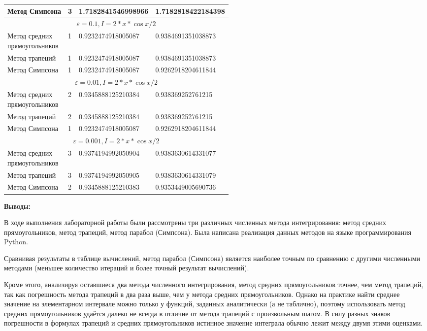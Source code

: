 \documentclass [12pt]{article}
\begin{document}
\begin{center}
\begin{tabular}{ |l|l|l|l| }
  Метод Симпсона & 3 & 1.7182841546998966 & 1.7182818422184398 \\ \hline
  \multicolumn{4}{|c|}{$\varepsilon=0.1 , I = 2*x*\cos{x/2}$} \\ \hline
  \parbox[t]{5cm} {Метод средних \\ прямоугольников } & 1 & 0.9232474918005087 & 0.9384691351038873 \\ \hline
  Метод трапеций & 1 & 0.9232474918005087 & 0.9384691351038873 \\ \hline
  Метод Симпсона & 1 & 0.9232474918005087 & 0.9262918204611844 \\ \hline
   \\ \hline
  \parbox[t]{5cm} {Метод средних \\ прямоугольников } & 2 & 0.9345888125210384 & 0.938369252761215 \\ \hline
  Метод трапеций & 2 & 0.9345888125210384 & 0.938369252761215 \\ \hline
  Метод Симпсона & 1 & 0.9232474918005087 & 0.9262918204611844 \\ \hline
   \\ \hline
  \parbox[t]{5cm} {Метод средних \\ прямоугольников } & 3 & 0.9374194992050904 & 0.9383630614331077 \\ \hline
  Метод трапеций & 3 & 0.9374194992050905 & 0.9383630614331079 \\ \hline
  Метод Симпсона & 2 & 0.9345888125210383 & 0.9353449005690736 \\ \hline
\end{tabular}
\end{center}

\textsc{\textbf{Выводы:}}

В ходе выполнения лабораторной работы были рассмотрены три различных численных метода интегрирования: метод средних прямоугольников, метод трапеций, метод парабол (Симпсона). Была написана реализация данных методов на языке программирования Python.

Сравнивая результаты в таблице вычислений, метод парабол (Симпсона) является наиболее точным по сравнению с другими численными методами (меньшее количество итераций и более точный результат вычислений). 

Кроме этого, анализируя оставшиеся два метода численного интегрирования, метод средних прямоугольников точнее, чем метод трапеций, так как погрешность метода трапеций в два раза выше, чем у метода средних прямоугольников. Однако на практике найти среднее значение на элементарном интервале можно только у функций, заданных аналитически (а не таблично), поэтому использовать метод средних прямоугольников удаётся далеко не всегда в отличие от метода трапеций с произвольным шагом. В силу разных знаков погрешности в формулах трапеций и средних прямоугольников истинное значение интеграла обычно лежит между двумя этими оценками.
\end{document}
